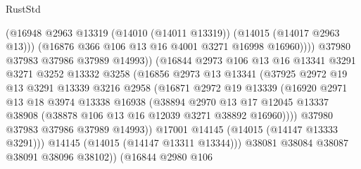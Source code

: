 \begin{lexlean}{RustStd}
\begin{coremodule}
                                (@16948
                                  @2963
                                  @13319
                                  (@14010 (@14011 @13319))
                                  (@14015 (@14017 @2963 @13)))
                                (@16876 @366 @106 @13 @16 @4001 @3271 @16998 @16960))))
                          @37980
                          @37983
                          @37986
                          @37989
                          @14993))
                      (@16844
                        @2973
                        @106
                        @13
                        @16
                        @13341
                        @3291
                        @3271
                        @3252
                        @13332
                        @3258
                        (@16856
                          @2973
                          @13
                          @13341
                          (@37925
                            @2972
                            @19
                            @13
                            @3291
                            @13339
                            @3216
                            @2958
                            (@16871
                              @2972
                              @19
                              @13339
                              (@16920
                                @2971
                                @13
                                @18
                                @3974
                                @13338
                                @16938
                                (@38894
                                  @2970
                                  @13
                                  @17
                                  @12045
                                  @13337
                                  @38908
                                  (@38878 @106 @13 @16 @12039 @3271 @38892 @16960))))
                            @37980
                            @37983
                            @37986
                            @37989
                            @14993))
                        @17001
                        @14145
                        (@14015 (@14147 @13333 @3291)))
                      @14145
                      (@14015 (@14147 @13311 @13344)))
                    @38081
                    @38084
                    @38087
                    @38091
                    @38096
                    @38102))
                (@16844
                  @2980
                  @106

\end{coremodule}
\end{lexlean}
